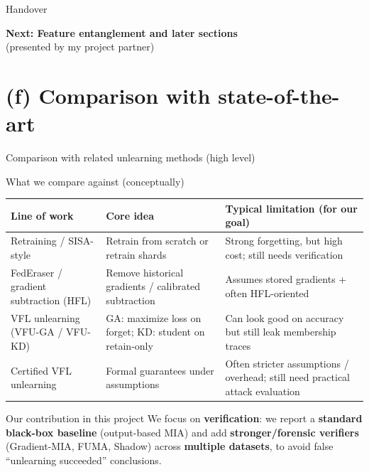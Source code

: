 \documentclass[aspectratio=169, 11pt]{beamer}
\begin{document}
\begin{frame}{Handover}
  \begin{center}
    {\Large \textbf{Next: Feature entanglement and later sections}}\\[0.8em]
    \large (presented by my project partner)
  \end{center}
\end{frame}

\section{(f) Comparison with state-of-the-art}

\begin{frame}{Comparison with related unlearning methods (high level)}
  \small
  \begin{block}{What we compare against (conceptually)}
    \begin{tabular}{@{}p{3.1cm}p{3.7cm}p{5.8cm}@{}}
      \toprule
      \textbf{Line of work} & \textbf{Core idea} & \textbf{Typical limitation (for our goal)} \\
      \midrule
      Retraining / SISA-style & Retrain from scratch or retrain shards & Strong forgetting, but high cost; still needs verification \\
      FedEraser / gradient subtraction (HFL) & Remove historical gradients / calibrated subtraction & Assumes stored gradients + often HFL-oriented \\
      VFL unlearning (VFU-GA / VFU-KD) & GA: maximize loss on forget; KD: student on retain-only & Can look good on accuracy but still leak membership traces \\
      Certified VFL unlearning & Formal guarantees under assumptions & Often stricter assumptions / overhead; still need practical attack evaluation \\
      \bottomrule
    \end{tabular}
  \end{block}
  \vspace{0.5em}
  \begin{exampleblock}{Our contribution in this project}
    We focus on \textbf{verification}: we report a \textbf{standard black-box baseline} (output-based MIA) and add \textbf{stronger/forensic verifiers}
    (Gradient-MIA, FUMA, Shadow) across \textbf{multiple datasets}, to avoid false ``unlearning succeeded'' conclusions.
  \end{exampleblock}
\end{frame}
\end{document}
